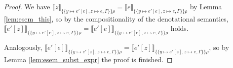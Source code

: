 \documentclass{jfp1}
\newtheorem{lemma}{Lemma}
\theoremstyle{nonumberbreak}
\newtheorem{proof}{Proof}
\newcommand{\sApp}[2]{#1\;#2}
\newcommand{\dom}[1]{\text{dom}\;#1}
\newcommand{\dsem}[2]{\llbracket #1 \rrbracket_{#2}}
\newcommand{\esem}[1]{\{\!\!\!\{#1\}\!\!\!\}}
\begin{document}
\begin{proof}
We have
$\dsem{z}{\esem{y \mapsto e'[e], z \mapsto e, \Gamma}\rho} = \dsem{e}{\esem{y \mapsto e'[e], z \mapsto e, \Gamma}\rho}$ by Lemma \ref{lem:esem_this}, so by the compositionality of the denotational semantics, $\dsem{e'[z]}{{\esem{y \mapsto e'[e], z \mapsto e, \Gamma}\rho}} = \dsem{e'[e]}{{\esem{y \mapsto e'[e], z \mapsto e, \Gamma}\rho}}$ holds.

Analogously, $\dsem{e'[e]}{{\esem{y \mapsto e'[z], z \mapsto e, \Gamma}\rho}} = \dsem{e'[z]}{{\esem{y \mapsto e'[z], z \mapsto e, \Gamma}\rho}}$, so by Lemma \ref{lem:esem_subst_expr} the proof is finished.
\end{proof}

%
%
%
%
\end{document}
